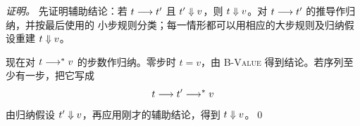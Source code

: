 \begin{taplauthorsolutionentrybox}
\textit{证明。}
先证明辅助结论：若 \(t\mathrel{\longrightarrow} t'\) 且 \(t'\mathrel{\Downarrow} v\)，则
\(t\mathrel{\Downarrow} v\)。对 \(t\mathrel{\longrightarrow} t'\) 的推导作归纳，并按最后使用的
小步规则分类；每一情形都可以用相应的大步规则及归纳假设重建
\(t\mathrel{\Downarrow} v\)。

现在对 \(t\mathrel{\longrightarrow^{*}} v\) 的步数作归纳。零步时 \(t=v\)，由
\textsc{B-Value} 得到结论。若序列至少有一步，把它写成
\[
  t\mathrel{\longrightarrow} t'\mathrel{\longrightarrow^{*}} v
\]
由归纳假设 \(t'\mathrel{\Downarrow} v\)，再应用刚才的辅助结论，得到
\(t\mathrel{\Downarrow} v\)。\qed


\end{taplauthorsolutionentrybox}

